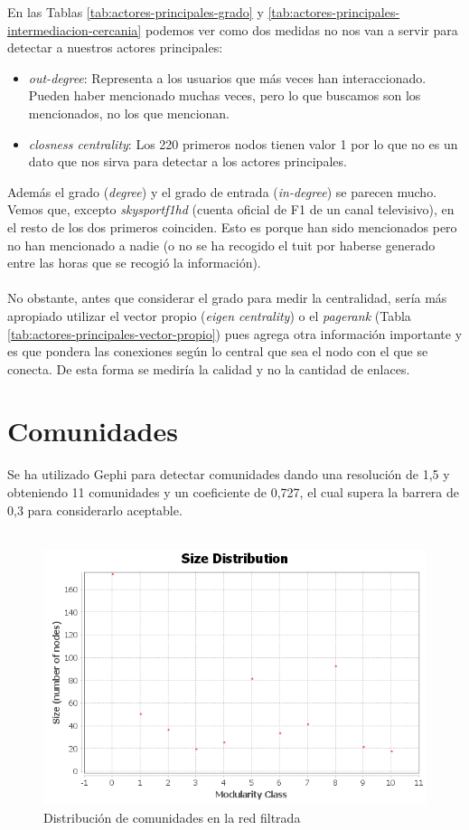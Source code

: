 En las Tablas \ref{tab:actores-principales-grado} y \ref{tab:actores-principales-intermediacion-cercania} podemos ver como dos medidas no nos van a servir para detectar a nuestros actores principales:

\begin{itemize}
	\item \textit{out-degree}: Representa a los usuarios que más veces han interaccionado. Pueden haber mencionado muchas veces, pero lo que buscamos son los mencionados, no los que mencionan.
	\item \textit{closness centrality}: Los 220 primeros nodos tienen valor 1 por lo que no es un dato que nos sirva para detectar a los actores principales.
\end{itemize}

Además el grado (\textit{degree}) y el grado de entrada (\textit{in-degree}) se parecen mucho. Vemos que, excepto \textit{skysportf1hd} (cuenta oficial de F1 de un canal televisivo), en el resto de los dos primeros coinciden. Esto es porque han sido mencionados pero no han mencionado a nadie (o no se ha recogido el tuit por haberse generado entre las horas que se recogió la información).
\\ \\
No obstante, antes que considerar el grado para medir la centralidad, sería más apropiado utilizar el vector propio (\textit{eigen centrality}) o el \textit{pagerank} (Tabla \ref{tab:actores-principales-vector-propio}) pues agrega otra información importante y es que pondera las conexiones según lo central que sea el nodo con el que se conecta. De esta forma se mediría la calidad y no la cantidad de enlaces.

\section{Comunidades}

Se ha utilizado Gephi para detectar comunidades dando una resolución de 1,5 y obteniendo 11 comunidades y un coeficiente de 0,727, el cual supera la barrera de 0,3 para considerarlo aceptable.
\\ \\

\begin{figure}[H]
	\centering
	\includegraphics[width=12cm]{../images/communities-size-distribution}
	\caption{Distribución de comunidades en la red filtrada}
	\label{fig:communities-size-distribution}
\end{figure}

